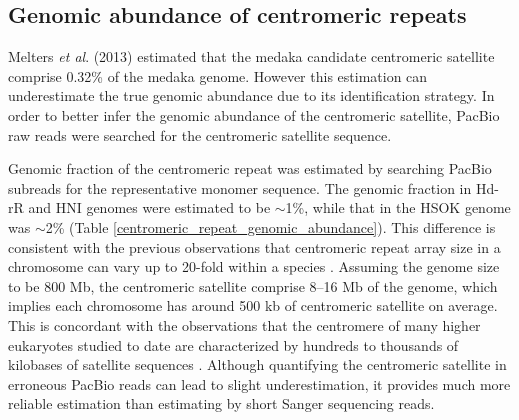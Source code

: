 \subsection*{Genomic abundance of centromeric repeats}
Melters \textit{et al}. (2013) estimated that the medaka candidate centromeric satellite comprise 0.32\% of the medaka genome. However this estimation can underestimate the true genomic abundance due to its identification strategy. In order to better infer the genomic abundance of the centromeric satellite, PacBio raw reads were searched for the centromeric satellite sequence.

Genomic fraction of the centromeric repeat was estimated by searching PacBio subreads for the representative monomer sequence. The genomic fraction in Hd-rR and HNI genomes were estimated to be $\sim$1\%, while that in the HSOK genome was $\sim$2\% (Table \ref{centromeric_repeat_genomic_abundance}). This difference is consistent with the previous observations that centromeric repeat array size in a chromosome can vary up to 20-fold within a species \cite{Miga}. Assuming the genome size to be 800 Mb, the centromeric satellite comprise 8--16 Mb of the genome, which implies each chromosome has around 500 kb of centromeric satellite on average. This is concordant with the observations that the centromere of many higher eukaryotes studied to date are characterized by hundreds to thousands of kilobases of satellite sequences \cite{Plohl}. Although quantifying the centromeric satellite in erroneous PacBio reads can lead to slight underestimation, it provides much more reliable estimation than estimating by short Sanger sequencing reads.



